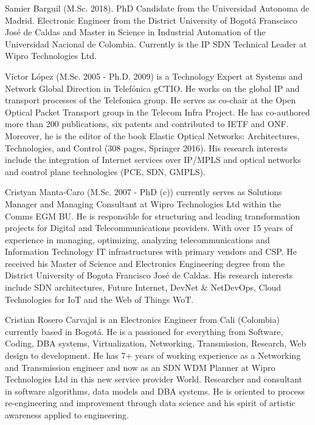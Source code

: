 \documentclass[a4paper,fleqn]{cas-dc}
\begin{document}




Samier Barguil (M.Sc. 2018). PhD Candidate from the Universidad Autonoma de Madrid. Electronic Engineer from the District University of Bogot\'a Franscisco Jos\'e de Caldas and Master in Science in Industrial Automation of the Universidad Nacional de Colombia. Currently is the IP SDN Technical Leader at Wipro Technologies Ltd. 
\endbio

Víctor López (M.Sc. 2005 - Ph.D. 2009) is a Technology Expert at Systems and Network Global Direction in Telefónica gCTIO. He works on the global IP and transport processes of the Telefonica group. He serves as co-chair at the Open Optical Packet Transport group in the Telecom Infra Project. He has co-authored more than 200 publications, six patents and contributed to IETF and ONF. Moreover, he is the editor of the book Elastic Optical Networks: Architectures, Technologies, and Control (308 pages, Springer 2016). His research interests include the integration of Internet services over IP/MPLS and optical networks and control plane technologies (PCE, SDN, GMPLS).
\endbio

Cristyan Manta-Caro (M.Sc. 2007 - PhD (c)) currently serves as Solutions Manager and Managing Consultant at Wipro Technologies Ltd within the Comms EGM BU. He is responsible for structuring and leading transformation projects for Digital and Telecommunications providers. With over 15 years of experience in managing, optimizing, analyzing telecommunications and Information Technology IT infrastructures with primary vendors and CSP. He received his Master of Science and Electronics Engineering degree from the District University of Bogota Francisco Jos\'e de Caldas. His research interests include SDN architectures, Future Internet, DevNet \& NetDevOps, Cloud Technologies for IoT and the Web of Things WoT.
\endbio

Cristian Rosero Carvajal is an Electronics Engineer from Cali (Colombia) currently based in Bogotá. He is a passioned for everything from Software, Coding, DBA systems, Virtualization, Networking, Transmission, Research, Web design to development. He has 7+ years of working experience as a Networking and Transmission engineer and now as an SDN WDM Planner at Wipro Technologies Ltd in this new service provider World. Researcher and consultant in software algorithms, data models and DBA systems. He is oriented to process re-engineering and improvement through data science and his spirit of artistic awareness applied to engineering.
\endbio
\end{document}

